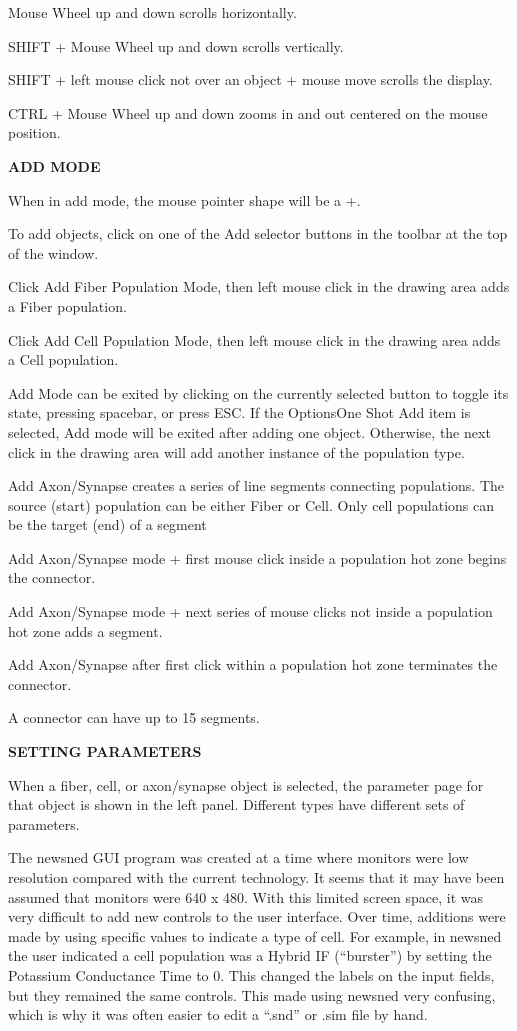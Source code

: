 \documentclass[12pt,openany,oneside]{book}
\newcommand{\ext}[1]{{{``.#1''}}}
\newcommand{\inquotes}[1]{{{``#1''}}}
\begin{document}
Mouse Wheel up and down scrolls horizontally.

SHIFT + Mouse Wheel up and down scrolls vertically.

SHIFT + left mouse click not over an object + mouse move scrolls the display.

CTRL + Mouse Wheel up and down zooms in and out centered on the mouse position.

\bigskip\centerline{\textbf{ADD MODE}}

When in add mode, the mouse pointer shape will be a +.

To add objects, click on one of the Add selector buttons in the toolbar at
the top of the window.

Click Add Fiber Population Mode, then left mouse click in the drawing area
adds a Fiber population.

Click Add Cell Population Mode, then left mouse click in the drawing area
adds a Cell population.

Add Mode can be exited by clicking on the currently selected button to
toggle its state, pressing spacebar, or press ESC. If the
Options\textrightarrow One
Shot Add item is selected, Add mode will be exited after adding one
object. Otherwise, the next click in the drawing area will add another
instance of the population type.

Add Axon/Synapse creates a series of line segments connecting
populations.
The source (start) population can be either Fiber or Cell. Only cell populations
can be the target (end) of a segment

Add Axon/Synapse mode + first mouse click inside a population hot zone
begins the connector.

Add Axon/Synapse mode + next series of mouse clicks not inside a
population hot zone adds a segment.

Add Axon/Synapse after first click within a population hot zone terminates
the connector.

A connector can have up to 15 segments.


\bigskip\centerline{\textbf{SETTING PARAMETERS}}

When a fiber, cell, or axon/synapse object is selected, the parameter page
for that object is shown in the left panel. Different types have different
sets of parameters.

The newsned GUI program was created at a time where monitors were low
resolution compared with the current technology. It seems that it may have
been assumed that monitors were 640 x 480. With this limited screen
space, it was very difficult to add new controls to the user interface.
Over time, additions were made by using specific values to indicate a type
of cell. For example, in newsned the user indicated a cell population was
a Hybrid IF (\inquotes{burster}) by setting the Potassium Conductance Time
to 0. This changed the labels on the input fields, but they remained the
same controls. This made using newsned very confusing, which is why it was
often easier to edit a \ext{snd} or .sim file by hand.
\end{document}
